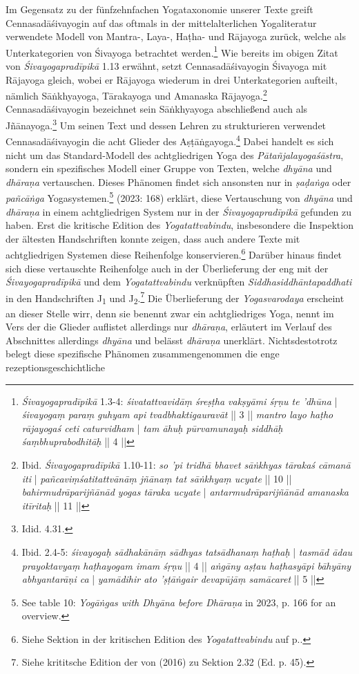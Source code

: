Im Gegensatz zu der fünfzehnfachen Yogataxonomie unserer Texte greift Cennasadāśivayogin auf das oftmals in der mittelalterlichen Yogaliteratur verwendete Modell von Mantra-, Laya-, Haṭha- und Rājayoga zurück, welche als Unterkategorien von Śivayoga betrachtet werden.\footnote{\textit{Śivayogapradīpikā} 1.3-4: \textit{śivatattvavidāṃ śreṣṭha vakṣyāmi śṛṇu te 'dhūna} | \textit{śivayogaṃ paraṃ guhyam api tvadbhaktigauravāt} || 3 || \textit{mantro layo haṭho rājayogaś ceti caturvidham} | \textit{tam āhuḥ pūrvamunayaḥ siddhāḥ śaṃbhuprabodhitāḥ} || 4 ||} Wie bereits im obigen Zitat von \textit{Śivayogapradīpikā} 1.13 erwähnt, setzt Cennasadāśivayogin Śivayoga mit Rājayoga gleich, wobei er Rājayoga wiederum in drei Unterkategorien aufteilt, nämlich Sāṅkhyayoga, Tārakayoga und Amanaska Rājayoga.\footnote{Ibid. \textit{Śivayogapradīpikā} 1.10-11: \textit{so 'pi tridhā bhavet sāṅkhyas tārakaś cāmanā iti} | \textit{pañcaviṃśatitattvānāṃ jñānaṃ tat sāṅkhyaṃ ucyate} || 10 || \textit{bahirmudrāparijñānād yogas tāraka ucyate} | \textit{antarmudrāparijñānād amanaska itīritaḥ} || 11 ||} Cennasadāśivayogin bezeichnet sein Sāṅkhyayoga abschließend auch als Jñānayoga.\footnote{Idid. 4.31.} Um seinen Text und dessen Lehren zu strukturieren verwendet Cennasadāśivayogin die acht Glieder des Aṣṭāṅgayoga.\footnote{Ibid. 2.4-5: \textit{śivayogaḥ sādhakānāṃ sādhyas tatsādhanaṃ haṭhaḥ} | \textit{tasmād ādau prayoktavyaṃ haṭhayogam imam śṛṇu} || 4 || \textit{aṅgāny aṣṭau haṭhasyāpi bāhyāny abhyantarāṇi ca} | \textit{yamādihir ato 'ṣṭāṅgair devapūjāṃ samācaret} || 5 ||} Dabei handelt es sich nicht um das Standard-Modell des achtgliedrigen Yoga des \textit{Pātañjalayogaśāstra}, sondern ein spezifisches Modell einer Gruppe von Texten, welche \textit{dhyāna} und \textit{dhāraṇa} vertauschen. Dieses Phänomen findet sich ansonsten nur in \textit{ṣaḍaṅga} oder \textit{pañcāṅga} Yogasystemen.\footnote{See table 10: \textit{Yogāṅgas with Dhyāna before Dhāraṇa} in \citeauthor{powell2023} 2023, p. 166 for an overview.} \citeauthor{powell2023} (2023: 168) erklärt, diese Vertauschung von \textit{dhyāna} und \textit{dhāraṇa} in einem achtgliedrigen System nur in der \textit{Śivayogapradīpikā} gefunden zu haben. Erst die kritische Edition des \textit{Yogatattvabindu}, insbesondere die Inspektion der ältesten Handschriften konnte zeigen, dass auch andere Texte mit achtgliedrigen Systemen diese Reihenfolge konservieren.\footnote{Siehe Sektion  in der kritischen Edition des \textit{Yogatattvabindu} auf p.\pageref{ashtanga}.} Darüber hinaus findet sich diese vertauschte Reihenfolge auch in der Überlieferung der eng mit der \textit{Śivayogapradīpikā} und dem \textit{Yogatattvabindu} verknüpften \textit{Siddhasiddhāntapaddhati} in den Handschriften J\textsubscript{1} und J\textsubscript{2}.\footnote{Siehe krititsche Edition der  von \citeauthor{ssplonavla} (2016) zu Sektion 2.32 (Ed. p. 45).} Die Überlieferung der \textit{Yogasvarodaya} erscheint an dieser Stelle wirr, denn sie benennt zwar ein achtgliedriges Yoga, nennt im Vers der die Glieder auflistet allerdings nur \textit{dhāraṇa}, erläutert im Verlauf des Abschnittes allerdings \textit{dhyāna} und belässt \textit{dhāraṇa} unerklärt. Nichtsdestotrotz belegt diese spezifische Phänomen zusammengenommen die enge rezeptionsgeschichtliche 